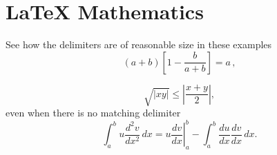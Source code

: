 \section{LaTeX Mathematics}
\label{sec:latexmath}
See how the delimiters are of reasonable size in these examples
\begin{equation}
\label{eq:del1}
	\left(a+b\right)\left[1-\frac{b}{a+b}\right]=a\,,
\end{equation}

\[
	\sqrt{|xy|}\leq\left|\frac{x+y}{2}\right|,
\]
even when there is no matching delimiter
\[
	\int_a^bu\frac{d^2v}{dx^2}\,dx
	=\left.u\frac{dv}{dx}\right|_a^b
	-\int_a^b\frac{du}{dx}\frac{dv}{dx}\,dx.
\]